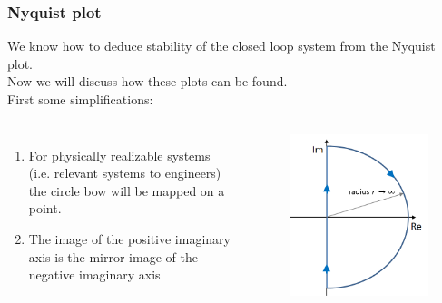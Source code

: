 \begin{frame}
	\frametitle{Nyquist plot}
	We know how to deduce stability of the closed loop system from the Nyquist plot.\\
	Now we will discuss how these plots can be found.\\
	\smallskip
	First some simplifications:
	\vspace{-1ex}
	\begin{columns}
		\begin{enumerate}
			\item For physically realizable systems (i.e. relevant systems to engineers) the circle bow will be mapped on a point.
			\item The image of the positive imaginary axis is the mirror image of the negative imaginary axis
		\end{enumerate}
		\vspace{-2ex}
		\begin{figure}
			\includegraphics[width=0.7\linewidth]{nyquist_plot}
		\end{figure}
	\end{columns}
\end{frame}

\newcommand{\asuivre}{\setcounter{sauvegardeenumi}{\theenumi}}
\newcommand{\suite}{\setcounter{enumi}{\thesauvegardeenumi}}

